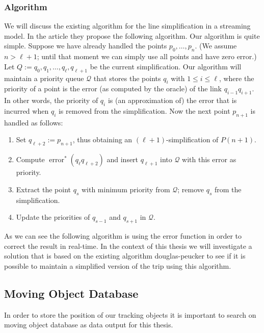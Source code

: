\documentclass[twoside,12pt, a4paper]{report}
\begin{document}
\subsubsection{Algorithm}
We will discuss the existing algorithm for the line simplification in a streaming model. In the article \cite{abam2007streaming} they propose
the following algorithm. Our algorithm is quite simple. Suppose we have already handled the points $p_0, \ldots, p_n$.
(We assume $n>\ell+1$; until that moment we can simply use all points and have zero error.) Let $Q:=q_0, q_1, \ldots, q_{\ell}, q_{\ell+1}$
be the current simplification. Our algorithm will maintain a priority queue $\mathcal{Q}$ that stores the points $q_i$ with $1 \leqslant i \leqslant \ell$,
where the priority of a point is the error (as computed by the oracle) of the link $q_{i-1} q_{i+1}$. In other words, the priority of $q_i$ is
(an approximation of) the error that is incurred when $q_i$ is removed from the simplification. Now the next point $p_{n+1}$ is handled as follows:

\begin{enumerate}
	\item  Set $q_{\ell+2}:=p_{n+1}$, thus obtaining an $(\ell+1)$-simplification of $P(n+1)$.
	\item  Compute $\operatorname{error}^*\left(q_{\ell} q_{\ell+2}\right)$ and insert $q_{\ell+1}$ into $\mathcal{Q}$ with this error as priority.
	\item  Extract the point $q_s$ with minimum priority from $\mathcal{Q}$; remove $q_s$ from the simplification.
	\item  Update the priorities of $q_{s-1}$ and $q_{s+1}$ in $\mathcal{Q}$.
	
\end{enumerate}

As we can see the following algorithm is using the error function in order to correct the result in real-time. In the context of this thesis we will investigate a solution
that is based on the existing algorithm douglas-peucker to see if it is possible to maintain a simplified version of the trip using this algorithm.




\subsection{Moving Object Database}
In order to store the position of our tracking objects it is important to
search on moving object database as data output for this thesis.
\cite[Moving objects are objects that change their value or location
with time. These can be vehicles, persons, animals, aircarft, the air
temperature of a city, the fuel price in a certain gas station, etc.
The ubiquity of tracking devices and IoT technologies has resulted
in collecting massive amounts of data that describe the temporal
evolution of such objects and values. This creates opportunities
to build applications on this data, which in turn calls for building]{zimanyi2019mobilitydb}
\end{document}
